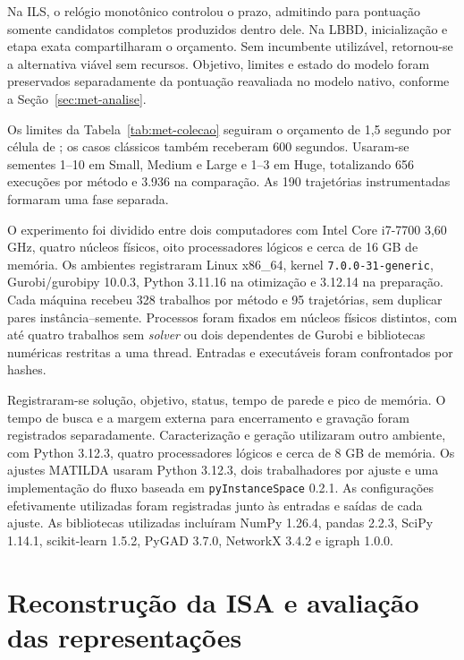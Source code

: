 Na ILS, o relógio monotônico controlou o prazo, admitindo para pontuação
somente candidatos completos produzidos dentro dele. Na LBBD,
inicialização e etapa exata compartilharam o orçamento. Sem incumbente
utilizável, retornou-se a alternativa viável sem recursos. Objetivo,
limites e estado do modelo foram preservados separadamente da pontuação
reavaliada no modelo nativo, conforme a Seção~\ref{sec:met-analise}.

Os limites da Tabela~\ref{tab:met-colecao} seguiram o orçamento de
1,5 segundo por célula de ;
os casos clássicos também receberam 600 segundos.
Usaram-se sementes 1--10 em Small, Medium e Large e 1--3 em Huge,
totalizando 656 execuções por método e 3.936 na comparação.
As 190 trajetórias instrumentadas formaram uma fase separada.

O experimento foi dividido entre dois computadores com Intel Core i7-7700
3,60 GHz, quatro núcleos físicos, oito processadores lógicos e cerca de
16 GB de memória. Os ambientes registraram Linux x86\_64, kernel
\texttt{7.0.0-31-generic}, Gurobi/gurobipy 10.0.3, Python 3.11.16
na otimização e 3.12.14 na preparação. Cada máquina recebeu 328 trabalhos
por método e 95 trajetórias, sem duplicar pares instância--semente.
Processos foram fixados em núcleos físicos distintos, com até quatro
trabalhos sem \textit{solver} ou dois dependentes de Gurobi e bibliotecas numéricas
restritas a uma thread. Entradas e executáveis foram confrontados por hashes.

Registraram-se solução, objetivo, status, tempo de parede e pico de memória.
O tempo de busca e a margem externa para encerramento e gravação foram
registrados separadamente. Caracterização e geração utilizaram outro ambiente, com Python
3.12.3, quatro processadores lógicos e cerca de 8 GB de memória.
Os ajustes MATILDA usaram Python 3.12.3, dois trabalhadores por ajuste e
uma implementação do fluxo baseada em \texttt{pyInstanceSpace} 0.2.1.
As configurações efetivamente utilizadas foram registradas junto às
entradas e saídas de cada ajuste.
As bibliotecas utilizadas incluíram NumPy 1.26.4, pandas 2.2.3, SciPy
1.14.1, scikit-learn 1.5.2, PyGAD 3.7.0, NetworkX 3.4.2 e igraph 1.0.0.

\section{Reconstrução da ISA e avaliação das representações}\label{sec:met-matilda}

